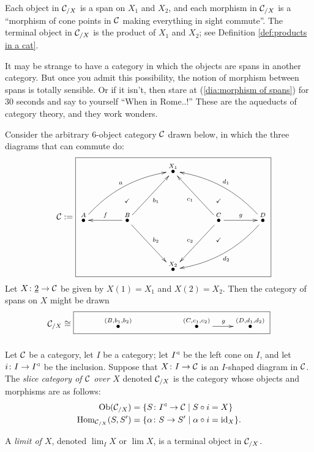 \begin{construction}[Products]
Each object in $\mathcal{C}_{/X}$ is a span on $X_1$ and $X_2$, and each morphism in $\mathcal{C}_{/X}$ is a “morphism of cone points in $\mathcal{C}$ making everything in sight commute”. The terminal object in $\mathcal{C}_{/X}$ is the product of $X_1$ and $X_2$; see Definition \ref{def:products in a cat}.

\end{construction}

It may be strange to have a category in which the objects are spans in another category. But once you admit this possibility, the notion of morphism between spans is totally sensible. Or if it isn't, then stare at (\ref{dia:morphism of spans}) for 30 seconds and say to yourself “When in Rome..!” These are the aqueducts of category theory, and they work wonders.

\begin{example}\label{ex:category of spans}

Consider the arbitrary 6-object category $\mathcal{C}$ drawn below, in which the three diagrams that can commute do:
$$\mcC:=\parbox{3in}{\fbox{\xymatrix@=39pt{&&\LMO{X_1}&\\\LMO{A}\ar@/^1pc/[urr]^a&\LMO{B}\ar[l]_f\ar@{}[u]|(.4){\checkmark}\ar[ur]_{b_1}\ar[dr]^{b_2}&&\LMO{C}\ar@{}[u]|(.4){\checkmark}\ar@{}[d]|(.4){\checkmark}\ar[ul]^{c_1}\ar[dl]_{c_2}\ar[r]^g&\LMO{D}\ar@/_1pc/[llu]_{d_1}\ar@/^1pc/[lld]^{d_2}\\&&\LMO{X_2}&}}}$$
Let $X\colon\underline{2}\rightarrow\mathcal{C}$ be given by $X(1)=X_1$ and $X(2)=X_2$. Then the category of spans on $X$ might be drawn
$$\mcC_{/X}\iso\fbox{\xymatrix{&\LMO{(B,b_1,b_2)}&&\LMO{(C,c_1,c_2)}\ar[r]^g&\LMO{(D,d_1,d_2)}}}$$

\end{example}


\subsubsection{}

\begin{definition}\label{def:slice and limit}

Let $\mathcal{C}$ be a category, let $I$ be a category; let $I^\triangleleft$ be the left cone on $I$, and let $i\colon I\rightarrow I^\triangleleft$ be the inclusion. Suppose that $X\colon I\rightarrow\mathcal{C}$ is an $I$-shaped diagram in $\mathcal{C}$. The {\em slice category of $\mathcal{C}$ over $X$} denoted $\mathcal{C}_{/X}$ is the category whose objects and morphisms are as follows:
\begin{align*}
\textnormal{Ob}(\mathcal{C}_{/X})&=\{S\colon I^\triangleleft\rightarrow\mathcal{C}{\;|\;}S\circ i=X\}\\
\textnormal{Hom}_{\mathcal{C}_{/X}}(S,S')&=\{\alpha\colon S\rightarrow S'{\;|\;}\alpha\circ i=\textnormal{id}_X\}.
\end{align*}

A {\em limit of $X$}, denoted $\lim_IX$ or $\lim X$, is a terminal object in $\mathcal{C}_{/X}$.

\end{definition}

